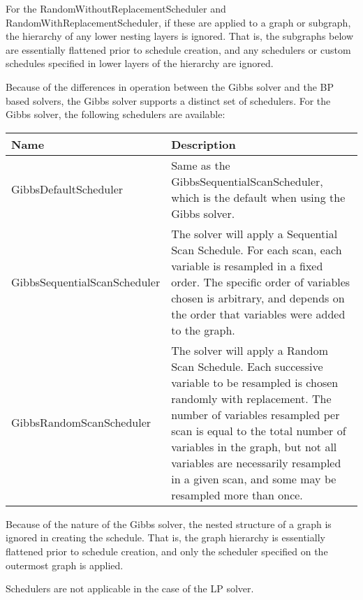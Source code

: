For the RandomWithoutReplacementScheduler and RandomWithReplacementScheduler, if these are applied to a graph or subgraph, the hierarchy of any lower nesting layers is ignored.  That is, the subgraphs below are essentially flattened prior to schedule creation, and any schedulers or custom schedules specified in lower layers of the hierarchy are ignored.


Because of the differences in operation between the Gibbs solver and the BP based solvers, the Gibbs solver supports a distinct set of schedulers.  For the Gibbs solver, the following schedulers are available:

\begin{tabular}{l p{4in}}
\textbf{Name} & \textbf{Description} \\ \hline \hline
%
\textsf{GibbsDefaultScheduler} & Same as the GibbsSequentialScanScheduler, which is the default when using the Gibbs solver. \\ \hline
%
\textsf{GibbsSequentialScanScheduler} & The solver will apply a Sequential Scan Schedule.  For each scan, each variable is resampled in a fixed order.  The specific order of variables chosen is arbitrary, and depends on the order that variables were added to the graph. \\ \hline
%
\textsf{GibbsRandomScanScheduler} & The solver will apply a Random Scan Schedule.  Each successive variable to be resampled is chosen randomly with replacement.  The number of variables resampled per scan is equal to the total number of variables in the graph, but not all variables are necessarily resampled in a given scan, and some may be resampled more than once. \\ \hline
%
\end{tabular}

Because of the nature of the Gibbs solver, the nested structure of a graph is ignored in creating the schedule.  That is, the graph hierarchy is essentially flattened prior to schedule creation, and only the scheduler specified on the outermost graph is applied.

Schedulers are not applicable in the case of the LP solver.

